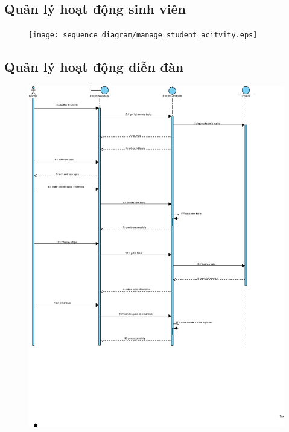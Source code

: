 \documentclass[./../main_file.tex]{subfiles}
\begin{document}
	\subsection{Quản lý hoạt động sinh viên }
	\begin{figure}[H]
		\centering
\texttt{[image: sequence\_diagram/manage\_student\_acitvity.eps]}
	\end{figure}
	
	\subsection{Quản lý hoạt động diễn đàn}
	\begin{figure}[H]
		\centering
		\includegraphics[width=\linewidth]{./images/sequence_diagram/3_12_manage_forum.eps}
	\end{figure}
	
\end{document}

